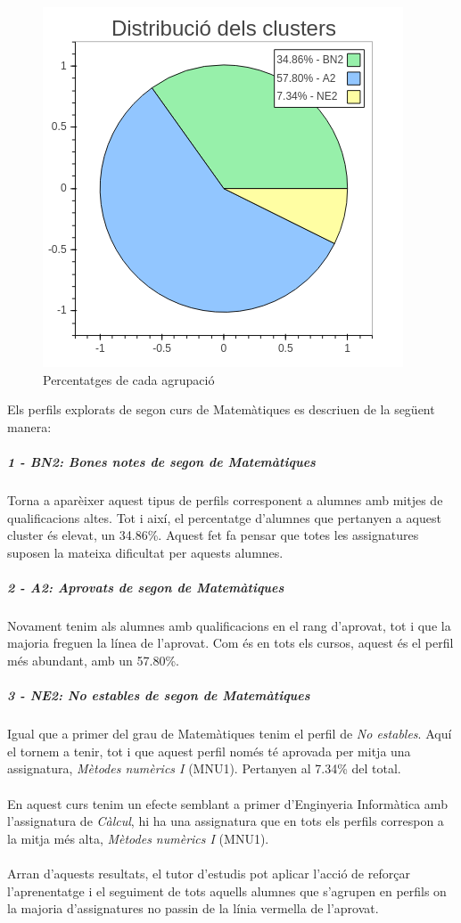 \documentclass[12pt,a4paper,catalan]{article}
\begin{document}
\begin{figure}[h]
\centering
\includegraphics[width=.4\linewidth]{img/perfils_segon_mates_pastilla.png}
\caption{Percentatges de cada agrupació}
\label{fig:passegonmates}
\end{figure}

\newpage

Els perfils explorats de segon curs de Matemàtiques es descriuen de la següent manera:

\subparagraph{1 - BN2: Bones notes de segon de Matemàtiques}
Torna a aparèixer aquest tipus de perfils corresponent a alumnes amb mitjes de qualificacions altes. Tot i així, el percentatge d'alumnes que pertanyen a aquest cluster és elevat, un 34.86\%. Aquest fet fa pensar que totes les assignatures suposen la mateixa dificultat per aquests alumnes.

\subparagraph{2 - A2: Aprovats de segon de Matemàtiques}
Novament tenim als alumnes amb qualificacions en el rang d'aprovat, tot i que la majoria freguen la línea de l'aprovat. Com és en tots els cursos, aquest és el perfil més abundant, amb un 57.80\%.

\subparagraph{3 - NE2: No estables de segon de Matemàtiques}
Igual que a primer del grau de Matemàtiques tenim el perfil de \textit{No estables}. Aquí el tornem a tenir, tot i que aquest perfil només té aprovada per mitja una assignatura, \textit{Mètodes numèrics I} (MNU1). Pertanyen al 7.34\% del total.
\\
\\
En aquest curs tenim un efecte semblant a primer d'Enginyeria Informàtica amb l'assignatura de \textit{Càlcul}, hi ha una assignatura que en tots els perfils correspon a la mitja més alta, \textit{Mètodes numèrics I} (MNU1).
\\
\\
Arran d'aquests resultats, el tutor d'estudis pot aplicar l'acció de reforçar l'aprenentatge i el seguiment de tots aquells alumnes que s'agrupen en perfils on la majoria d'assignatures no passin de la línia vermella de l'aprovat.
\end{document}
